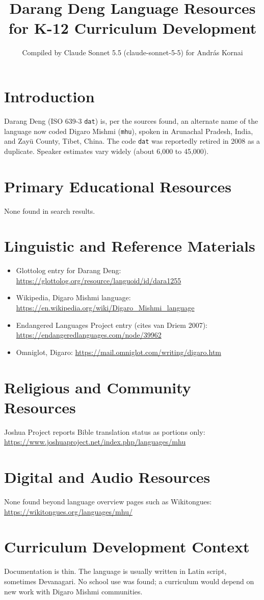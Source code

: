\documentclass[12pt]{article}
\title{Darang Deng Language Resources for K-12 Curriculum Development}
\author{Compiled by Claude Sonnet 5.5 (claude-sonnet-5-5) for Andr\'as Kornai}
\date{}
\begin{document}
\maketitle

\section{Introduction}
Darang Deng (ISO 639-3 \texttt{dat}) is, per the sources found, an alternate name of the language now coded Digaro Mishmi (\texttt{mhu}), spoken in Arunachal Pradesh, India, and Zayü County, Tibet, China. The code \texttt{dat} was reportedly retired in 2008 as a duplicate. Speaker estimates vary widely (about 6,000 to 45,000).

\section{Primary Educational Resources}
None found in search results.

\section{Linguistic and Reference Materials}
\begin{itemize}
\item Glottolog entry for Darang Deng: \url{https://glottolog.org/resource/languoid/id/dara1255}
\item Wikipedia, Digaro Mishmi language: \url{https://en.wikipedia.org/wiki/Digaro_Mishmi_language}
\item Endangered Languages Project entry (cites van Driem 2007): \url{https://endangeredlanguages.com/node/39962}
\item Omniglot, Digaro: \url{https://mail.omniglot.com/writing/digaro.htm}
\end{itemize}

\section{Religious and Community Resources}
Joshua Project reports Bible translation status as portions only: \url{https://www.joshuaproject.net/index.php/languages/mhu}

\section{Digital and Audio Resources}
None found beyond language overview pages such as Wikitongues: \url{https://wikitongues.org/languages/mhu/}

\section{Curriculum Development Context}
Documentation is thin. The language is usually written in Latin script, sometimes Devanagari. No school use was found; a curriculum would depend on new work with Digaro Mishmi communities.
\end{document}
